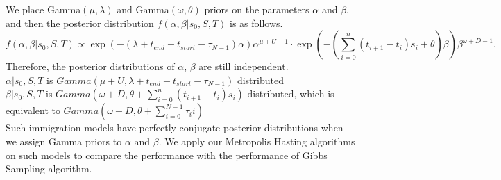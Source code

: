 We place Gamma$(\mu, \lambda)$ and Gamma$(\omega,  \theta)$ priors on the parameters $\alpha$ and $\beta$,
and then the posterior distribution $f(\alpha, \beta | s_0,S,T)$ is as follows.
$$ f(\alpha, \beta | s_0,S,T) \propto \exp(-(\lambda + t_{end} - t_{start}- \tau_{N - 1})\alpha) \alpha^{\mu + U -1} \cdot \exp(-(\sum_{i=0}^n (t_{i+1} - t_i)s_i + \theta)\beta) \beta^{\omega+ D -1}.$$
Therefore, the posterior distributions of $\alpha$, $\beta$ are still independent. \\
$\alpha | s_0,S,T$ is $Gamma(\mu+ U,\lambda + t_{end} - t_{start}- \tau_{N - 1})$ distributed\\
$\beta | s_0,S,T$ is $Gamma(\omega+ D,\theta + \sum_{i=0}^n (t_{i+1} - t_i)s_i)$ distributed, which is equivalent to $Gamma(\omega+ D,\theta +\sum_{i=0}^{N - 1} \tau_ii)$\\
Such immigration models have perfectly conjugate posterior distributions when we assign Gamma priors to $\alpha$ and $\beta$. We apply our Metropolis Hasting algorithms on such models to compare the performance with the performance of Gibbs Sampling algorithm.
